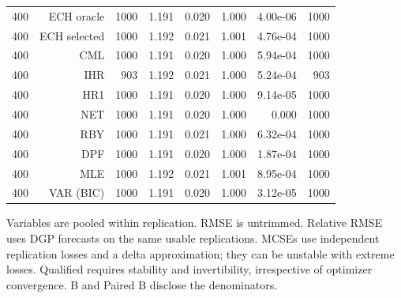 \begin{table}[p]
\begin{tabular}{rrrrrrrr}
400 & ECH oracle & 1000 & 1.191 & 0.020 & 1.000 & 4.00e-06 & 1000 \\
400 & ECH selected & 1000 & 1.192 & 0.021 & 1.001 & 4.76e-04 & 1000 \\
400 & CML & 1000 & 1.191 & 0.020 & 1.000 & 5.94e-04 & 1000 \\
400 & IHR &  903 & 1.192 & 0.021 & 1.000 & 5.24e-04 &  903 \\
400 & HR1 & 1000 & 1.191 & 0.020 & 1.000 & 9.14e-05 & 1000 \\
400 & NET & 1000 & 1.191 & 0.020 & 1.000 & 0.000 & 1000 \\
400 & RBY & 1000 & 1.191 & 0.021 & 1.000 & 6.32e-04 & 1000 \\
400 & DPF & 1000 & 1.191 & 0.020 & 1.000 & 1.87e-04 & 1000 \\
400 & MLE & 1000 & 1.192 & 0.021 & 1.001 & 8.95e-04 & 1000 \\
400 & VAR (BIC) & 1000 & 1.191 & 0.020 & 1.000 & 3.12e-05 & 1000 \\
\bottomrule\end{tabular}
\par\medskip
\begin{minipage}{0.98\linewidth}\footnotesize Variables are pooled within replication. RMSE is untrimmed. Relative RMSE uses DGP forecasts on the same usable replications. MCSEs use independent replication losses and a delta approximation; they can be unstable with extreme losses. Qualified requires stability and invertibility, irrespective of optimizer convergence. B and Paired B disclose the denominators.\end{minipage}
\end{table}

